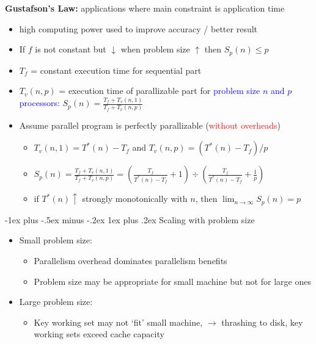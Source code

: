 \documentclass[10pt,landscape]{article}
\makeatletter
\newcommand{\subsubsubsection}{\@startsection{subsubsection}{3}{0mm}%
                                {-1ex plus -.5ex minus -.2ex}%
                                {1ex plus .2ex}%
                                {\normalfont\scriptsize\bfseries}}
\makeatother
\begin{document}
\begin{multicols*}{3}
\textbf{Gustafson's Law:} applications where main constraint is application time
\begin{itemize}[topsep=0pt,noitemsep,wide=0pt, leftmargin=\dimexpr{} + 2\relax]
    \item high computing power used to improve accuracy / better result
    \item If $f$ is not constant but $\downarrow$ when problem size $\uparrow$ then $S_p(n) \leq p$
    \item $T_f$ = constant execution time for sequential part
    \item $T_v(n, p)$ = execution time of parallizable part for \textcolor{blue}{problem size $n$ and $p$ processors}: $S_p(n) = \frac{T_f + T_v(n,1)}{T_f + T_v(n,p)}$
    \item Assume parallel program is perfectly parallizable (\textcolor{red}{without overheads})
    \begin{itemize}[topsep=0pt,noitemsep,wide=0pt, leftmargin=\dimexpr{} + 2\relax]
        \item $T_v(n,1) = T^*(n) - T_f$ and $T_v(n,p) = (T^*(n) - T_f)/p$
        \item $S_p(n) = \frac{T_f + T_v(n,1)}{T_f + T_v(n,p)} = (\frac{T_f}{T^*(n) - T_f} + 1) \div ({\frac{T_f}{T^*(n) - T_f} + \frac{1}{p}})$
        \item if $T^*(n) \uparrow$ strongly monotonically with $n$, then $\lim_{n\rightarrow\infty}S_p(n) = p$
    \end{itemize}
\end{itemize}

\subsubsubsection{Scaling with problem size}
\begin{itemize}[topsep=0pt,noitemsep,wide=0pt, leftmargin=\dimexpr{} + 2\relax]
    \item Small problem size:
    \begin{itemize}[topsep=0pt,noitemsep,wide=0pt, leftmargin=\dimexpr{} + 2\relax]
        \item Parallelism overhead dominates parallelism benefits
        \item Problem size may be appropriate for small machine but not for large ones
    \end{itemize}
    \item Large problem size:
    \begin{itemize}[topsep=0pt,noitemsep,wide=0pt, leftmargin=\dimexpr{} + 2\relax]
        \item Key working set may not `fit' small machine, $\rightarrow$ thrashing to disk, key working sets exceed cache capacity
    \end{itemize}
\end{itemize}


\end{multicols*}
\end{document}
